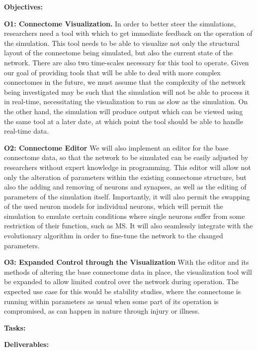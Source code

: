 \documentclass[a4paper,11pt]{article}
\begin{document}
\textbf{Objectives:}

\textbf{O1: Connectome Visualization.}
In order to better steer the simulations, researchers need a tool with which to get immediate feedback on the operation of the simulation. This tool needs to be able to visualize not only the structural layout of the connectome being simulated, but also the current state of the network.
There are also two time-scales necessary for this tool to operate. Given our goal of providing tools that will be able to deal with more complex connectomes in the future, we must assume that the complexity of the network being investigated may be such that the simulation will not be able to process it in real-time, necessitating the visualization to run as slow as the simulation. On the other hand, the simulation will produce output which can be viewed using the same tool at a later date, at which point the tool should be able to handle real-time data.

\textbf{O2: Connectome Editor} 
We will also implement an editor for the base connectome data, so that the network to be simulated can be easily adjusted by researchers without expert knowledge in programming. This editor will allow not only the alteration of parameters within the existing connectome structure, but also the adding and removing of neurons and synapses, as well as the editing of parameters of the simulation itself. Importantly, it will also permit the swapping of the used neuron models for individual neurons, which will permit the simulation to emulate certain conditions where single neurons suffer from some restriction of their function, such as MS. It will also seamlessly integrate with the evolutionary algorithm in order to fine-tune the network to the changed parameters.

\textbf{O3: Expanded Control through the Visualization}
With the editor and its methods of altering the base connectome data in place, the visualization tool will be expanded to allow limited control over the network during operation. The expected use case for this would be stability studies, where the connectome is running within parameters as usual when some part of its operation is compromised, as can happen in nature through injury or illness.

\textbf{Tasks:}

\textbf{Deliverables:} 

\end{document}
